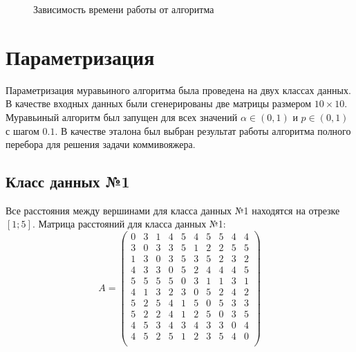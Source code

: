 \begin{figure}[H]
	\centering
	\captionsetup{justification=centering}
	\caption{Зависимость времени работы от алгоритма}
	\label{plt:times}
\end{figure}

\section{Параметризация}

Параметризация муравьиного алгоритма была проведена на двух классах данных. 
В качестве входных данных были сгенерированы две матрицы размером $10 \times 10$. 
Муравьиный алгоритм был запущен для всех значений $\alpha \in (0, 1)$ и $p \in (0, 1)$ с шагом $0.1$. 
В качестве эталона был выбран результат работы алгоритма полного перебора для решения задачи коммивояжера.

\subsection{Класс данных №1}

Все расстояния между вершинами для класса данных №1 находятся на отрезке $[1; 5]$. 
Матрица расстояний для класса данных №1:
\begin{equation}
	A = 
	\begin{pmatrix}
		0 & 3 & 1 & 4 & 5 & 4 & 5 & 5 & 4 & 4 \\
		3 & 0 & 3 & 3 & 5 & 1 & 2 & 2 & 5 & 5 \\
		1 & 3 & 0 & 3 & 5 & 3 & 5 & 2 & 3 & 2 \\
		4 & 3 & 3 & 0 & 5 & 2 & 4 & 4 & 4 & 5 \\
		5 & 5 & 5 & 5 & 0 & 3 & 1 & 1 & 3 & 1 \\
		4 & 1 & 3 & 2 & 3 & 0 & 5 & 2 & 4 & 2 \\
		5 & 2 & 5 & 4 & 1 & 5 & 0 & 5 & 3 & 3 \\
		5 & 2 & 2 & 4 & 1 & 2 & 5 & 0 & 3 & 5 \\
		4 & 5 & 3 & 4 & 3 & 4 & 3 & 3 & 0 & 4 \\
		4 & 5 & 2 & 5 & 1 & 2 & 3 & 5 & 4 & 0 \\
	\end{pmatrix}
\end{equation}

